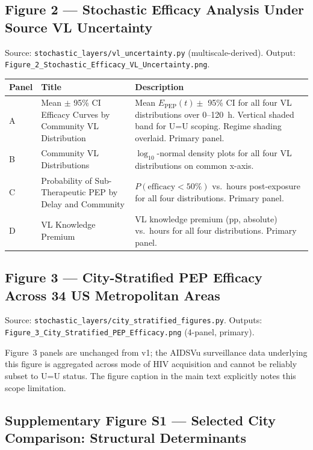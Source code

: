 \documentclass[11pt]{article}
\theoremstyle{definition}
\theoremstyle{remark}
\newcommand{\Epep}{E_{\text{PEP}}}
\begin{document}
\subsection{Figure 2 --- Stochastic Efficacy Analysis Under Source VL Uncertainty}

Source: \texttt{stochastic\_layers/vl\_uncertainty.py} (multiscale-derived). Output: \texttt{Figure\_2\_Stochastic\_Efficacy\_VL\_Uncertainty.png}.

\begin{table}[H]
\centering
\small
\begin{tabular}{@{}lp{4cm}p{8cm}@{}}
\toprule
\textbf{Panel} & \textbf{Title} & \textbf{Description} \\
\midrule
A & Mean $\pm$ 95\% CI Efficacy Curves by Community VL Distribution & Mean $\Epep(t) \pm$ 95\% CI for all four VL distributions over 0--120~h. Vertical shaded band for U=U scoping. Regime shading overlaid. Primary panel. \\
B & Community VL Distributions & $\log_{10}$-normal density plots for all four VL distributions on common x-axis. \\
C & Probability of Sub-Therapeutic PEP by Delay and Community & $P(\text{efficacy} < 50\%)$ vs.\ hours post-exposure for all four distributions. Primary panel. \\
D & VL Knowledge Premium & VL knowledge premium (pp, absolute) vs.\ hours for all four distributions. Primary panel. \\
\bottomrule
\end{tabular}
\end{table}

\subsection{Figure 3 --- City-Stratified PEP Efficacy Across 34 US Metropolitan Areas}

Source: \texttt{stochastic\_layers/city\_stratified\_figures.py}. Outputs: \texttt{Figure\_3\_City\_Stratified\_PEP\_Efficacy.png} (4-panel, primary).

Figure~3 panels are unchanged from v1; the AIDSVu surveillance data underlying this figure is aggregated across mode of HIV acquisition and cannot be reliably subset to U=U status. The figure caption in the main text explicitly notes this scope limitation.

\subsection{Supplementary Figure S1 --- Selected City Comparison: Structural Determinants}
\end{document}
